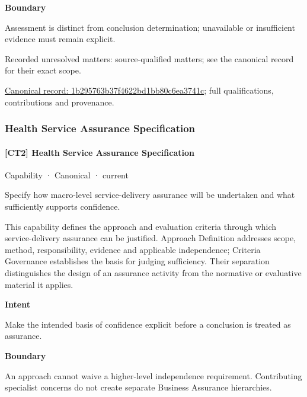 \textbf{Boundary}



Assessment is distinct from conclusion determination; unavailable or insufficient evidence must remain explicit.


{\small Recorded unresolved matters: source-qualified matters; see the canonical record for their exact scope.}\par
{\footnotesize \href{../../../../continuum/strategy/capability/1b295763b37f4622bd1bb80c6ea3741c.md}{Canonical record: 1b295763b37f4622bd1bb80c6ea3741c}; full qualifications, contributions and provenance.}\par
\subsubsection{Health Service Assurance Specification}

\paragraph{[CT2] Health Service Assurance Specification}

\label{element:ec5c4d1219464433b2cee5c5a988fef7}
{\small Capability · Canonical · current}\par

Specify how macro-level service-delivery assurance will be undertaken and what sufficiently supports confidence.



This capability defines the approach and evaluation criteria through which service-delivery assurance can be justified. Approach Definition addresses scope, method, responsibility, evidence and applicable independence; Criteria Governance establishes the basis for judging sufficiency. Their separation distinguishes the design of an assurance activity from the normative or evaluative material it applies.



\textbf{Intent}



Make the intended basis of confidence explicit before a conclusion is treated as assurance.



\textbf{Boundary}



An approach cannot waive a higher-level independence requirement. Contributing specialist concerns do not create separate Business Assurance hierarchies.


